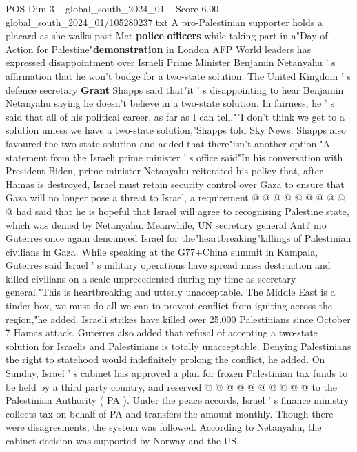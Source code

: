 \begin{textsample}{POS Dim 3 – global\_south\_2024\_01 – Score 6.00 – global\_south\_2024\_01/105280237.txt}  \label{ex:f3_pos_352}
A pro-Palestinian supporter holds a placard as she walks past Met \textbf{police} \textbf{officers} while taking part in a"Day of Action for Palestine"\textbf{demonstration} in London AFP World leaders has expressed disappointment over Israeli Prime Minister Benjamin Netanyahu ' s affirmation that he won't budge for a two-state solution.
The United Kingdom ' s defence secretary \textbf{Grant} Shapps said that"it ' s disappointing to hear Benjamin Netanyahu saying he doesn't believe in a two-state solution.
In fairness, he ' s said that all of his political career, as far as I can tell.""I don't think we get to a solution unless we have a two-state solution,"Shapps told Sky News.
Shapps also favoured the two-state solution and added that there"isn't another option."A statement from the Israeli prime minister ' s office said"In his conversation with President Biden, prime minister Netanyahu reiterated his policy that, after Hamas is destroyed, Israel must retain security control over Gaza to ensure that Gaza will no longer pose a threat to Israel, a requirement @ @ @ @ @ @ @ @ @ @ had said that he is hopeful that Israel will agree to recognising Palestine state, which was denied by Netanyahu.
Meanwhile, UN secretary general Ant? nio Guterres once again denounced Israel for the"heartbreaking"killings of Palestinian civilians in Gaza.
While speaking at the G77+China summit in Kampala, Guterres said Israel ' s military operations have spread mass destruction and killed civilians on a scale unprecedented during my time as secretary-general."This is heartbreaking and utterly unacceptable.
The Middle East is a tinder-box, we must do all we can to prevent conflict from igniting across the region,"he added.
Israeli strikes have killed over 25,000 Palestinians since October 7 Hamas attack.
Guterres also added that refusal of accepting a two-state solution for Israelis and Palestinians is totally unacceptable.
Denying Palestinians the right to statehood would indefinitely prolong the conflict, he added.
On Sunday, Israel ' s cabinet has approved a plan for frozen Palestinian tax funds to be held by a third party country, and reserved @ @ @ @ @ @ @ @ @ @ to the Palestinian Authority ( PA ).
Under the peace accords, Israel ' s finance ministry collects tax on behalf of PA and transfers the amount monthly.
Though there were disagreements, the system was followed.
According to Netanyahu, the cabinet decision was supported by Norway and the US.

\end{textsample}
